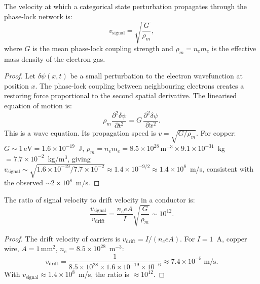 \begin{theorem}
\label{thm:ch18-signal}
The velocity at which a categorical state perturbation propagates through
the phase-lock network is:
\begin{equation}
  v_{\mathrm{signal}} = \sqrt{\frac{G}{\rho_m}},
  \label{eq:ch18-vsignal}
\end{equation}
where $G$ is the mean phase-lock coupling strength and
$\rho_m = n_e m_e$ is the effective mass density of the electron gas.
\end{theorem}

\begin{proof}
Let $\delta\psi(x,t)$ be a small perturbation to the electron wavefunction
at position $x$.  The phase-lock coupling between neighbouring electrons
creates a restoring force proportional to the second spatial derivative.
The linearised equation of motion is:
\begin{equation}
  \rho_m \frac{\partial^2 \delta\psi}{\partial t^2}
    = G\, \frac{\partial^2 \delta\psi}{\partial x^2}.
  \label{eq:ch18-wave}
\end{equation}
This is a wave equation.  Its propagation speed is $v = \sqrt{G/\rho_m}$.
For copper: $G \sim 1\,\mathrm{eV} = 1.6\times 10^{-19}$~J,
$\rho_m = n_e m_e = 8.5\times 10^{28}\,\mathrm{m}^{-3} \times
9.1\times 10^{-31}$~kg~$= 7.7\times 10^{-2}$~kg/m$^3$, giving
$v_{\mathrm{signal}} \sim \sqrt{1.6\times 10^{-19}/7.7\times 10^{-2}}
\approx 1.4\times 10^{-9/2} \approx 1.4\times 10^8$~m/s, consistent with
the observed $\sim\!2\times 10^8$~m/s.
\end{proof}

\begin{theorem}
\label{thm:ch18-vratio}
The ratio of signal velocity to drift velocity in a conductor is:
\begin{equation}
  \frac{v_{\mathrm{signal}}}{v_{\mathrm{drift}}}
    = \frac{n_e e A}{I} \sqrt{\frac{G}{\rho_m}} \sim 10^{12}.
  \label{eq:ch18-vratio}
\end{equation}
\end{theorem}

\begin{proof}
The drift velocity of carriers is $v_{\mathrm{drift}} = I/(n_e e A)$.
For $I = 1$~A, copper wire, $A = 1\,\mathrm{mm}^2$,
$n_e = 8.5\times 10^{28}$~m$^{-3}$:
\begin{equation}
  v_{\mathrm{drift}} = \frac{1}{8.5\times 10^{28}\times 1.6\times 10^{-19}
    \times 10^{-6}} \approx 7.4\times 10^{-5}\;\mathrm{m/s}.
\end{equation}
With $v_{\mathrm{signal}} \approx 1.4\times 10^8$~m/s, the ratio is
$\approx 10^{12}$.
\end{proof}

